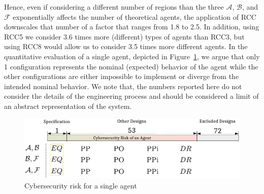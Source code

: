 \documentclass[conference]{IEEEtran}
\newcommand{\assertionRegion}{\mathcal{A}}
\newcommand{\beliefRegion}{\mathcal{B}}
\newcommand{\factRegion}{\mathcal{F}}
\begin{document}
Hence, even if considering a different number of regions than the three
$\assertionRegion$, $\beliefRegion$, and $\factRegion$ exponentially affects
the number of theoretical agents, the application of RCC downscales that number
of a factor that ranges from 1.8 to 2.5. In addition, using RCC5 we consider
3.6 times more (different) types of agents than RCC3, but using RCC8 would
allow us to consider 3.5 times more different agents.
In the quantitative evaluation of a single agent, depicted in Figure~\ref{fig:quantitative},
we argue that only 1 configuration represents the nominal (expected) behavior 
of the agent while the other configurations are either impossible to 
implement or diverge from the intended nominal behavior. We note 
that, the numbers reported here do not consider the details of the
engineering process and should be considered a limit of an abstract 
representation of the system.
\begin{figure}[t]
	\centering
	\includegraphics[width=\columnwidth]{quantitative.pdf}
	\caption{Cybersecurity risk for a single agent}
	\label{fig:quantitative}
\end{figure}
\end{document}
